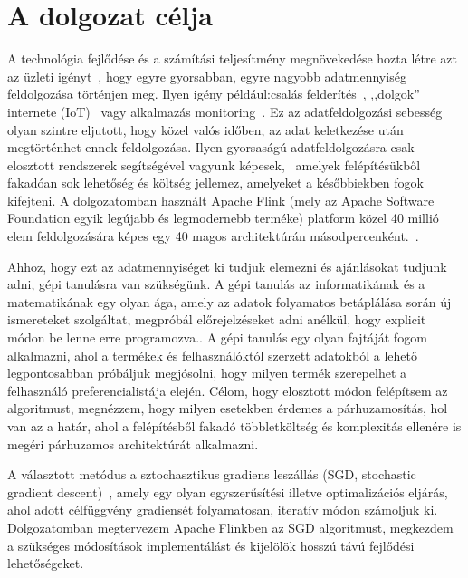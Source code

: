 \documentclass[a4paper,12pt]{article}
\begin{document}
\section{A dolgozat célja}
A technológia fejlődése és a számítási teljesítmény megnövekedése hozta létre azt az üzleti igényt~\cite{rta}, hogy egyre gyorsabban, egyre nagyobb adatmennyiség feldolgozása történjen meg. Ilyen igény például:csalás felderítés~\parencite{fraud}, ,,dolgok'' internete (IoT)~\cite{iot} vagy alkalmazás monitoring~\cite{ganalitycs}. Ez az adatfeldolgozási sebesség olyan szintre eljutott, hogy közel valós időben, az adat keletkezése után megtörténhet ennek feldolgozása. Ilyen gyorsaságú adatfeldolgozásra csak elosztott rendszerek segítségével vagyunk képesek,~\cite{ucl} amelyek felépítésükből fakadóan sok lehetőség és költség jellemez, amelyeket a későbbiekben fogok kifejteni. A dolgozatomban használt Apache Flink (mely az Apache Software Foundation egyik legújabb és legmodernebb terméke) platform közel 40 millió elem feldolgozására képes egy 40 magos architektúrán másodpercenként.~\cite{flinkintro}.\newline

Ahhoz, hogy ezt az adatmennyiséget ki tudjuk elemezni és ajánlásokat tudjunk adni, gépi tanulásra van szükségünk. A gépi tanulás az informatikának és a matematikának egy olyan ága, amely az adatok folyamatos betáplálása során új ismereteket szolgáltat, megpróbál előrejelzéseket adni anélkül, hogy explicit módon be lenne erre programozva.\cite{ml}. A gépi tanulás egy olyan fajtáját fogom alkalmazni, ahol a termékek és felhasználóktól szerzett adatokból a lehető legpontosabban próbáljuk megjósolni, hogy milyen termék szerepelhet a felhasználó preferencialistája elején. Célom, hogy elosztott módon felépítsem az algoritmust, megnézzem, hogy milyen esetekben érdemes a párhuzamosítás, hol van az a határ, ahol a felépítésből fakadó többletköltség és komplexitás ellenére is megéri párhuzamos architektúrát alkalmazni. 
\newline

A választott metódus a sztochasztikus gradiens leszállás (SGD, stochastic gradient descent)~\cite{sgd}, amely egy olyan egyszerűsítési illetve optimalizációs eljárás, ahol adott célfüggvény gradiensét folyamatosan, iteratív módon számoljuk ki. Dolgozatomban megtervezem Apache Flinkben az SGD algoritmust, megkezdem a szükséges módosítások implementálást és kijelölök hosszú távú fejlődési lehetőségeket.

\newpage
\end{document}
